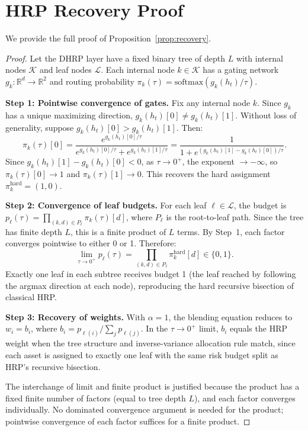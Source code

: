 \appendix

\section{HRP Recovery Proof}
\label{app:proof}

We provide the full proof of Proposition~\ref{prop:recovery}.

\begin{proof}
Let the DHRP layer have a fixed binary tree of depth $L$ with internal nodes $\mathcal{K}$ and leaf nodes $\mathcal{L}$. Each internal node $k \in \mathcal{K}$ has a gating network $g_k: \mathbb{R}^d \to \mathbb{R}^2$ and routing probability $\pi_k(\tau) = \mathrm{softmax}(g_k(h_t)/\tau)$.

\textbf{Step 1: Pointwise convergence of gates.}
Fix any internal node $k$. Since $g_k$ has a unique maximizing direction, $g_k(h_t)[0] \neq g_k(h_t)[1]$. Without loss of generality, suppose $g_k(h_t)[0] > g_k(h_t)[1]$. Then:
\[
\pi_k(\tau)[0] = \frac{e^{g_k(h_t)[0]/\tau}}{e^{g_k(h_t)[0]/\tau} + e^{g_k(h_t)[1]/\tau}} = \frac{1}{1 + e^{(g_k(h_t)[1] - g_k(h_t)[0])/\tau}}.
\]
Since $g_k(h_t)[1] - g_k(h_t)[0] < 0$, as $\tau \to 0^+$, the exponent $\to -\infty$, so $\pi_k(\tau)[0] \to 1$ and $\pi_k(\tau)[1] \to 0$. This recovers the hard assignment $\pi_k^{\text{hard}} = (1, 0)$.

\textbf{Step 2: Convergence of leaf budgets.}
For each leaf $\ell \in \mathcal{L}$, the budget is $p_\ell(\tau) = \prod_{(k,d) \in P_\ell} \pi_k(\tau)[d]$, where $P_\ell$ is the root-to-leaf path. Since the tree has finite depth $L$, this is a finite product of $L$ terms. By Step~1, each factor converges pointwise to either 0 or 1. Therefore:
\[
\lim_{\tau \to 0^+} p_\ell(\tau) = \prod_{(k,d) \in P_\ell} \pi_k^{\text{hard}}[d] \in \{0, 1\}.
\]
Exactly one leaf in each subtree receives budget 1 (the leaf reached by following the argmax direction at each node), reproducing the hard recursive bisection of classical HRP.

\textbf{Step 3: Recovery of weights.}
With $\alpha = 1$, the blending equation reduces to $w_i = b_i$, where $b_i = p_{\ell(i)} / \sum_j p_{\ell(j)}$. In the $\tau \to 0^+$ limit, $b_i$ equals the HRP weight when the tree structure and inverse-variance allocation rule match, since each asset is assigned to exactly one leaf with the same risk budget split as HRP's recursive bisection.

The interchange of limit and finite product is justified because the product has a fixed finite number of factors (equal to tree depth $L$), and each factor converges individually. No dominated convergence argument is needed for the product; pointwise convergence of each factor suffices for a finite product.
\end{proof}

